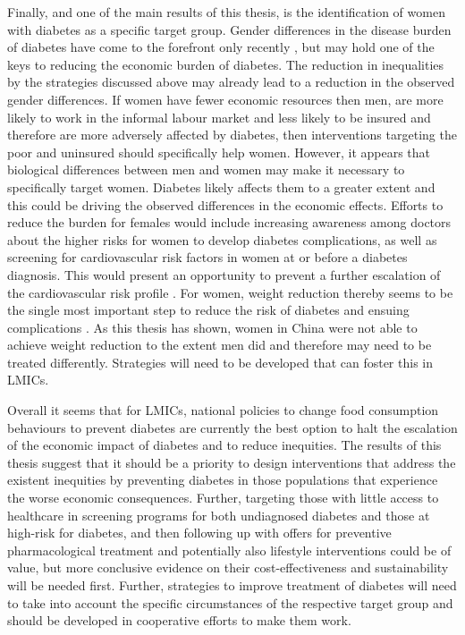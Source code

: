 Finally, and one of the main results of this thesis, is the identification of women with diabetes as a specific target group. Gender differences in the disease burden of diabetes have come to the forefront only recently \parencite{Peters2015}, but may hold one of the keys to reducing the economic burden of diabetes. The reduction in inequalities by the strategies discussed above may already lead to a reduction in the observed gender differences. If women have fewer economic resources then men, are more likely to work in the informal labour market and less likely to be insured \parencite{Galli2008} and therefore are more adversely affected by diabetes, then interventions targeting the poor and uninsured should specifically help women. However, it appears that biological differences between men and women may make it necessary to specifically target women. Diabetes likely affects them to a greater extent \parencite{Peters2015,Peters2014a,Peters2014,Bertram2010} and this could be driving the observed differences in the economic effects. Efforts to reduce the burden for females would include increasing awareness among doctors about the higher risks for women to develop diabetes complications, as well as screening for cardiovascular risk factors in women at or before a diabetes diagnosis. This would present an opportunity to prevent a further escalation of the cardiovascular risk profile \parencite{Peters2015}. For women, weight reduction thereby seems to be the single most important step to reduce the risk of diabetes and ensuing complications \parencite{Peters2015}. As this thesis has shown, women in China were not able to achieve weight reduction to the extent men did and therefore may need to be treated differently. Strategies will need to be developed that can foster this in \acp{LMIC}. 

Overall it seems that for \acp{LMIC}, national policies to change food consumption behaviours to prevent diabetes are currently the best option to halt the escalation of the economic impact of diabetes and to reduce inequities. The results of this thesis suggest that it should be a priority to design interventions that address the existent inequities by preventing diabetes in those populations that experience the worse economic consequences. Further, targeting those with little access to healthcare in screening programs for both undiagnosed diabetes and those at high-risk for diabetes, and then following up with offers for preventive pharmacological treatment and potentially also lifestyle interventions could be of value, but more conclusive evidence on their cost-effectiveness and sustainability will be needed first. Further, strategies to improve treatment of diabetes will need to take into account the specific circumstances of the respective target group and should be developed in cooperative efforts to make them work.




